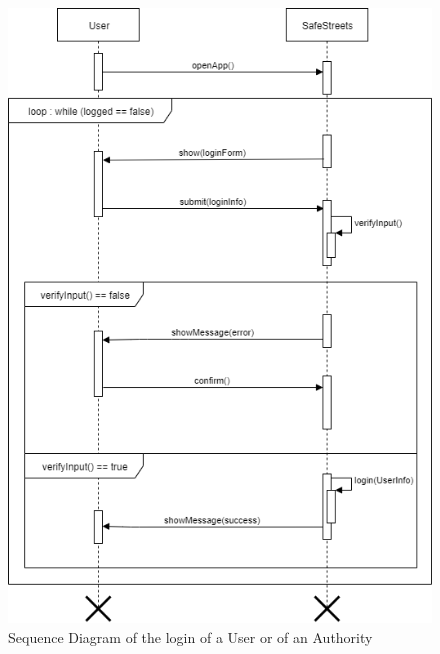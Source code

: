     \begin{figure}[h]
        \centering
        \includegraphics[scale=0.5]{Images/SeqDiag_login.png}
        \caption{Sequence Diagram of the login of a User or of an Authority}
    \end{figure}
    
